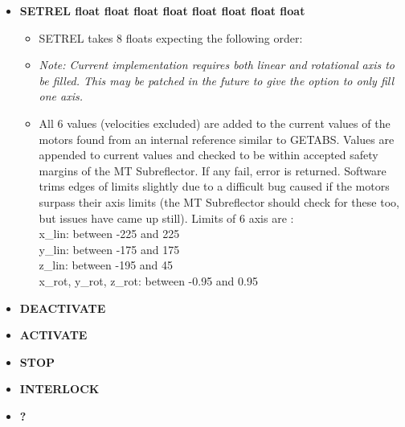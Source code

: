 \documentclass[12pt]{report}
\begin{document}
\begin{itemize}
                        
		\item[] {\bf{SETREL float float float float float float float float }}
			\begin{itemize}
				\item[] {SETREL takes 8 floats expecting the following order:}
				
				\item[]  {\textit{Note: Current implementation requires both linear and rotational axis to be filled. This may be patched in the 
				future to give the option to only fill one axis.}}
				\item[] {All 6 values (velocities excluded) are  added to the current values of the motors found from an internal reference 
				similar to GETABS. Values are appended to current values and checked to be within accepted safety margins of the MT
				 Subreflector. If any fail, error is returned. Software trims edges of limits slightly due to a difficult bug caused if the 
				 motors surpass their axis limits (the MT Subreflector should check for these too, but issues have came up still). 
				 Limits of 6 axis are : \\ 
				x\_lin: between -225 and 225 \\
				y\_lin: between -175 and 175 \\
				z\_lin: between -195 and 45 \\
				x\_rot, \hspace{2px} y\_rot, \hspace{2px} z\_rot: between -0.95 and 0.95}
				
			\end{itemize}
			
		\item[] {\bf{DEACTIVATE}}
			
		\item[] {\bf{ACTIVATE}}

		\item[] {\bf{STOP}}

		\item[] {\bf{INTERLOCK}}

		\item[] {\bf{?}}
\end{itemize}
 
\end{document}
